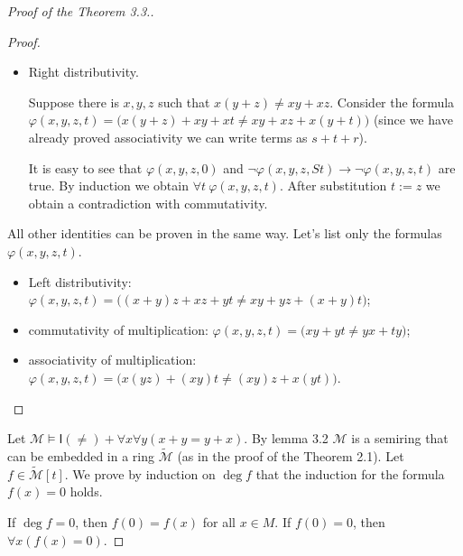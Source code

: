 \documentclass[a4paper,14pt]{article}
\theoremstyle{definition}
\theoremstyle{theorem}
\theoremstyle{lemma}
\theoremstyle{proposition}
\theoremstyle{remark}
\theoremstyle{corollary}
\theoremstyle{problem}
\theoremstyle{hypothesis}
\begin{document}
\begin{proof}[Proof of the Theorem 3.3.]
\begin{proof}
\begin{itemize}
            so, we have got a contradiction. Applying induction to the formula $\varphi$, we obtain $\forall t \:\varphi(x, y, z, t)$. Now, substitute $z$ instead of $t$: $$(x + (y + z)) + ((x + y) + z) \ne ((x + y) + z) + (x + (y + z)),$$
            
            contradiction with commutativity of addition.
            
            \item Right distributivity.
            
            Suppose there is $x, y, z$ such that $x(y + z) \ne xy + xz$. Consider the formula $\varphi(x, y, z, t) = \Big(x(y + z) + xy + xt \ne xy + xz + x(y + t)\Big)$ (since we have already proved associativity we can write terms as $s + t + r$).
            
            It is easy to see that $\varphi(x, y, z, 0)$ and $\neg\varphi(x, y, z, St) \rightarrow \neg \varphi(x, y, z, t)$ are true. By induction we obtain $\forall t \: \varphi(x, y, z, t)$. After substitution $t := z$ we obtain a contradiction with commutativity.
        \end{itemize}
        
        All other identities can be proven in the same way. Let's list only the formulas $\varphi(x, y, z, t)$.
        
        \begin{itemize}
            \item Left distributivity: $\varphi(x, y, z, t) = \Big((x + y)z + xz + yt \ne xy + yz + (x + y)t\Big)$;
            
            \item commutativity of multiplication: $\varphi(x, y, z, t) = \Big(xy + yt \ne yx + ty\Big)$;
            
            \item associativity of multiplication: $\varphi(x, y, z, t) = \Big(x(yz) + (xy)t \ne (xy)z + x(yt)\Big)$.
        \end{itemize}
    \end{proof}
    
    Let $\mathcal{M} \vDash \mathsf{I}(\ne) + \forall x \forall y (x + y = y + x)$. By lemma 3.2 $\mathcal{M}$ is a semiring that can be embedded in a ring $\widetilde{\mathcal{M}}$ (as in the proof of the Theorem 2.1). Let $f \in \widetilde{\mathcal{M}}[t]$. We prove by induction on $\deg f$ that the induction for the formula $f(x) = 0$ holds.
    
    If $\deg f = 0$, then $f(0) = f(x)$ for all $x \in M$. If $f(0) = 0$, then $\forall x (f(x) = 0)$.
    

\end{proof}
\end{document}
